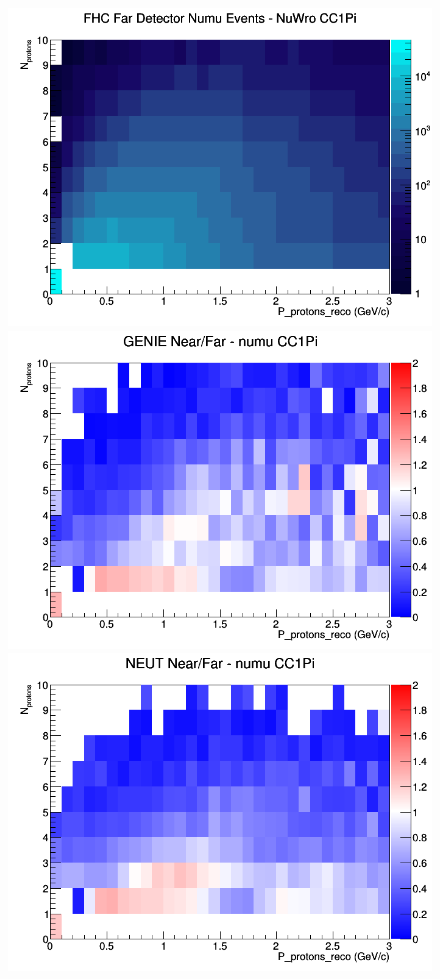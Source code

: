 \begin{figure}[h]
\endminipage
{}
\includegraphics[width=\linewidth]{eff_N_P/FGT/protons/CC1Pi_FHC_FD_numu_N_P_NuWro.png}
\endminipage
\newline
{}
\includegraphics[width=\linewidth]{eff_N_P/FGT/protons/ratios/CC1Pi_GENIE_numu_NF_N_P.png}
\endminipage
{}
\includegraphics[width=\linewidth]{eff_N_P/FGT/protons/ratios/CC1Pi_NEUT_numu_NF_N_P.png}

\end{figure}
